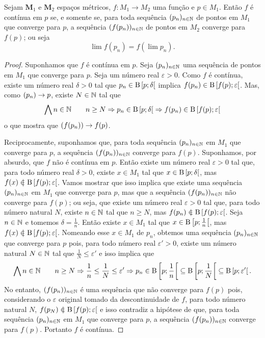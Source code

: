 \begin{proposition}
Sejam $\bm M_1$ e $\bm M_2$ espaços métricos, $f: M_1 \to M_2$ uma função e $p \in M_1$. Então $f$ é contínua em $p$ se, e somente se, para toda sequência $(p_n)_{n \in \mathbb{N}}$ de pontos em $M_1$ que converge para $p$, a sequência $(f(p_n))_{n \in \mathbb{N}}$ de pontos em $M_2$ converge para $f(p)$; ou seja
	\begin{equation*}
	\lim f(p_n) = f(\lim p_n).
	\end{equation*}
\end{proposition}
\begin{proof}
	Suponhamos que $f$ é contínua em $p$. Seja $(p_n)_{n \in \mathbb{N}}$ uma sequência de pontos em $M_1$ que converge para $p$. Seja um número real $\varepsilon > 0$. Como $f$ é contínua, existe um número real $\delta > 0$ tal que $p_n \in \mathrm{B}\left[{p};{\delta}\right[$ implica $f(p_n) \in \mathrm{B}\left[{f(p)};{\varepsilon}\right[$. Mas, como $(p_n) \rightarrow p$, existe $N \in \mathbb{N}$ tal que
	\begin{equation*}
	\bigwedge\nolimits n \in \mathbb{N} \qquad n \geq N \Rightarrow p_n \in \mathrm{B}\left[{p};{\delta}\right[ \Rightarrow f(p_n) \in \mathrm{B}\left[{f(p)};{\varepsilon}\right[
	\end{equation*}
o que mostra que $(f(p_n)) \rightarrow f(p)$.

	Reciprocamente, suponhamos que, para toda sequência $(p_n)_{n \in \mathbb{N}}$ em $M_1$ que converge para $p$, a sequência $(f(p_n))_{n \in \mathbb{N}}$ converge para $f(p)$. Suponhamos, por absurdo, que $f$ não é contínua em $p$. Então existe um número real $\varepsilon > 0$ tal que, para todo número real $\delta > 0$, existe $x \in M_1$ tal que $x \in \mathrm{B}\left[{p};{\delta}\right[$, mas $f(x) \notin \bola{f(p)}{\varepsilon}$. Vamos mostrar que isso implica que existe uma sequência $(p_n)_{n \in \mathbb{N}}$ em $M_1$ que converge para $p$, mas que a sequência $(f(p_n))_{n \in \mathbb{N}}$ não converge para $f(p)$; ou seja, que existe um número real $\varepsilon > 0$ tal que, para todo número natural $N$, existe $n \in \mathbb{N}$ tal que $n \geq N$, mas $f(p_n) \notin \bola{f(p)}{\varepsilon}$. Seja $n \in \mathbb{N}$ e tomemos $\delta = \frac{1}{n}$. Então existe $x \in M_1$ tal que $x \in \mathrm{B}\left[{p};{\frac{1}{n}}\right[$, mas $f(x) \notin \bola{f(p)}{\varepsilon}$. Nomeando esse $x \in M_1$ de $p_n$, obtemos uma sequência $(p_n)_{n \in \mathbb{N}}$ que converge para $p$ pois, para todo número real $\varepsilon' > 0$, existe um número natural $N \in \mathbb{N}$ tal que $\frac{1}{N} \leq \varepsilon'$ e isso implica que
\begin{equation*}
	\bigwedge\nolimits n \in \mathbb{N} \qquad n \geq N \Rightarrow \frac{1}{n} \leq \frac{1}{N} \leq \varepsilon' \Rightarrow p_n \in \mathrm{B}\left[{p};{\frac{1}{n}}\right[ \subseteq \mathrm{B}\left[{p};{\frac{1}{N}}\right[ \subseteq \mathrm{B}\left[{p};{\varepsilon'}\right[.
	\end{equation*}
	No entanto, $(f(p_n))_{n \in \mathbb{N}}$ é uma sequência que não converge para $f(p)$ pois, considerando o $\varepsilon$ original tomado da descontinuidade de $f$, para todo número natural $N$, $f(p_N) \notin \bola{f(p)}{\varepsilon}$ e isso contradiz a hipótese de que, para toda sequência $(p_n)_{n \in \mathbb{N}}$ em $M_1$ que converge para $p$, a sequência $(f(p_n))_{n \in \mathbb{N}}$ converge para $f(p)$. Portanto $f$ é contínua.
\end{proof}

